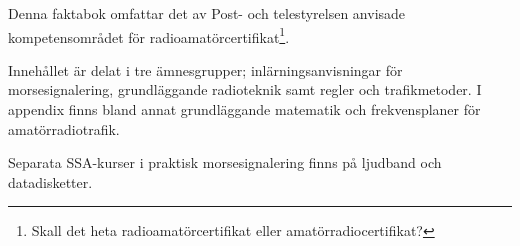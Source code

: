 \onecolumn

\begin{rev-omarbetas}
Denna faktabok omfattar det av Post- och telestyrelsen anvisade
kompetensområdet för radioamatörcertifikat\footnote{Skall det heta 
radioamatörcertifikat eller amatörradiocertifikat?}.

Innehållet är delat i tre ämnesgrupper; inlärningsanvisningar för
morsesignalering, grundläggande radioteknik samt regler och
trafikmetoder. I appendix finns bland annat grundläggande matematik
och frekvensplaner för amatörradiotrafik.

Separata SSA-kurser i praktisk morsesignalering finns på ljudband och
datadisketter.
\end{rev-omarbetas}

\twocolumn
